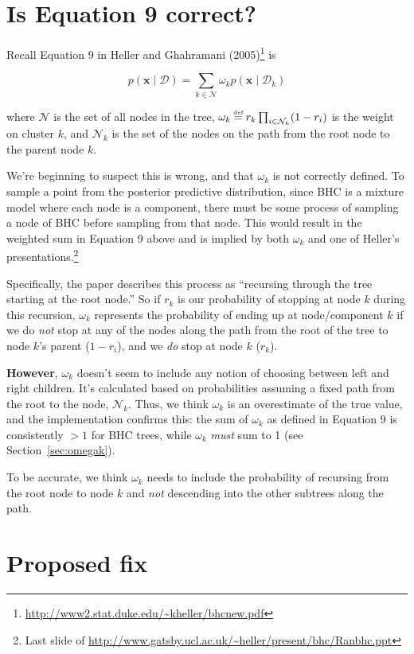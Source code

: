 \documentclass[letterpaper]{article}
\newcommand\defeq{\stackrel{\mathclap{\normalfont\mbox{\tiny def}}}{=}}
\begin{document}
\section{Is Equation 9 correct?}

Recall Equation 9 in Heller and Ghahramani
(2005)\footnote{\url{http://www2.stat.duke.edu/~kheller/bhcnew.pdf}} is

$$
p(\mathbf{x} \mid \mathcal{D}) = \sum_{k \in \mathcal{N}} \omega_k p(\mathbf{x} \mid \mathcal{D}_k)
$$

where $\mathcal{N}$ is the set of all nodes in the tree, $\omega_k \defeq r_k \prod_{i \in
\mathcal{N}_k} (1 - r_i)$ is the weight on cluster $k$, and $\mathcal{N}_k$ is the set of the nodes
on the path from the root node to the parent node $k$.

We're beginning to suspect this is wrong, and that $\omega_k$ is not correctly defined. To sample a
point from the posterior predictive distribution, since BHC is a mixture model where each node is a
component, there must be some
process of sampling a node of BHC before sampling from that node. This would
result in the weighted sum in Equation 9 above and is implied by both $\omega_k$ and one of Heller's
presentations.\footnote{Last slide of
\url{http://www.gatsby.ucl.ac.uk/~heller/present/bhc/Ranbhc.ppt}}

Specifically, the paper describes this process as ``recursing through the tree starting at the root
node.'' So if $r_k$ is our probability of stopping at node $k$ during this recursion, $\omega_k$
represents the probability of ending up at node/component $k$ if we do \emph{not} stop at any of
the nodes along the path from the root of the tree to node $k$'s parent ($1 - r_i$), and we
\emph{do} stop at node $k$ ($r_k$).

\textbf{However}, $\omega_k$ doesn't seem to include any notion of choosing between left and right
children.  It's calculated based on probabilities assuming a fixed path from the root to the node,
$\mathcal{N}_k$. Thus, we think $\omega_k$ is an overestimate of the true value, and the
implementation confirms this: the sum of $\omega_k$ as defined in Equation 9 is consistently $> 1$
for BHC trees, while $\omega_k$ \emph{must} sum to 1 (see Section~\ref{sec:omegak}).

To be accurate, we think $\omega_k$ needs to include the probability of recursing from the root
node to node $k$ and \emph{not} descending into the other subtrees along the path.

\section{Proposed fix}
\end{document}
